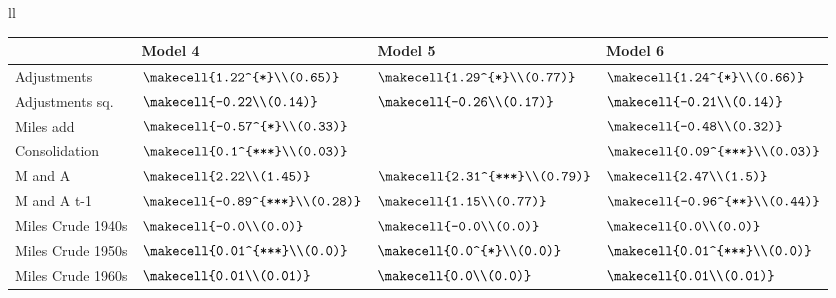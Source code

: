\begin{tabular}{ll}

\begin{tabular}{llll}
\toprule
{} &                           Model 4 &                          Model 5 &                           Model 6 \\
\midrule
Adjustments         &     $\makecell{1.22^{*}\\(0.65)}$ &    $\makecell{1.29^{*}\\(0.77)}$ &     $\makecell{1.24^{*}\\(0.66)}$ \\
Adjustments sq.     &        $\makecell{-0.22\\(0.14)}$ &       $\makecell{-0.26\\(0.17)}$ &        $\makecell{-0.21\\(0.14)}$ \\
Miles add           &    $\makecell{-0.57^{*}\\(0.33)}$ &                                  &        $\makecell{-0.48\\(0.32)}$ \\
Consolidation       &    $\makecell{0.1^{***}\\(0.03)}$ &                                  &   $\makecell{0.09^{***}\\(0.03)}$ \\
M and A             &         $\makecell{2.22\\(1.45)}$ &  $\makecell{2.31^{***}\\(0.79)}$ &          $\makecell{2.47\\(1.5)}$ \\
M and A t-1         &  $\makecell{-0.89^{***}\\(0.28)}$ &        $\makecell{1.15\\(0.77)}$ &   $\makecell{-0.96^{**}\\(0.44)}$ \\
Miles Crude 1940s   &          $\makecell{-0.0\\(0.0)}$ &         $\makecell{-0.0\\(0.0)}$ &           $\makecell{0.0\\(0.0)}$ \\
Miles Crude 1950s   &    $\makecell{0.01^{***}\\(0.0)}$ &      $\makecell{0.0^{*}\\(0.0)}$ &    $\makecell{0.01^{***}\\(0.0)}$ \\
Miles Crude 1960s   &         $\makecell{0.01\\(0.01)}$ &          $\makecell{0.0\\(0.0)}$ &         $\makecell{0.01\\(0.01)}$ \\

\end{tabular}
\end{tabular}
